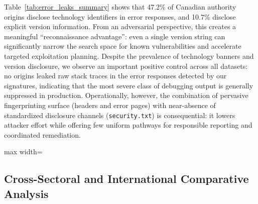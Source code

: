 \documentclass[a4paper,fleqn]{cas-sc}
\begin{document}
    Table~\ref{tab:error_leaks_summary} shows that 47.2\% of Canadian authority origins disclose technology identifiers in error responses, and 10.7\% disclose explicit version information. 
    From an adversarial perspective, this creates a meaningful ``reconnaissance advantage'': even a single version string can significantly narrow the search space for known vulnerabilities and accelerate targeted exploitation planning. 
    Despite the prevalence of technology banners and version disclosure, we observe an important positive control across all datasets: no origins leaked raw stack traces in the error responses detected by our signatures, indicating that the most severe class of debugging output is generally suppressed in production. 
    Operationally, however, the combination of pervasive fingerprinting surface (headers and error pages) with near-absence of standardized disclosure channels (\texttt{security.txt}) is consequential: it lowers attacker effort while offering few uniform pathways for responsible reporting and coordinated remediation.

    \begin{table}[t]
      \caption{Information leakage in HTTP error responses by dataset.}
      \label{tab:error_leaks_summary}
      \centering
      \scriptsize
      \setlength{\tabcolsep}{4pt}
      \renewcommand{\arraystretch}{1.15}
      
      \begin{adjustbox}{max width=\columnwidth}
      \end{adjustbox}
    \end{table}

\subsection{Cross-Sectoral and International Comparative Analysis}
\label{sec:comparative_synthesis}
\end{document}
